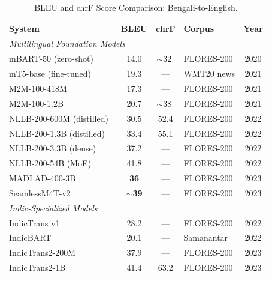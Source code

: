 \documentclass[conference]{IEEEtran}
\begin{document}
\begin{table}[t]
  \centering
  \caption{BLEU and chrF Score Comparison: Bengali-to-English.}
  \label{tab:bleu}
  \small
  \setlength{\tabcolsep}{3pt}
  \begin{tabular}{p{3.4cm} c c p{1.7cm} c}
    \toprule
    \textbf{System} & \textbf{BLEU} & \textbf{chrF} & \textbf{Corpus} & \textbf{Year} \\
    \midrule
    \multicolumn{5}{l}{\textit{Multilingual Foundation Models}} \\
    mBART-50 (zero-shot)~\cite{liu2020mbart50}   & 14.0  & $\sim$32$^\dagger$ & FLORES-200  & 2020 \\
    mT5-base (fine-tuned)~\cite{xue2021mt5}      & 19.3  & ---                & WMT20 news  & 2021 \\
    M2M-100-418M~\cite{fan2021m2m100}            & 17.3  & ---                & FLORES-200  & 2021 \\
    M2M-100-1.2B~\cite{fan2021m2m100}            & 20.7  & $\sim$38$^\dagger$ & FLORES-200  & 2021 \\
    NLLB-200-600M (distilled)~\cite{nllb2022}    & 30.5  & 52.4               & FLORES-200  & 2022 \\
    NLLB-200-1.3B (distilled)~\cite{nllb2022}    & 33.4  & 55.1               & FLORES-200  & 2022 \\
    NLLB-200-3.3B (dense)~\cite{nllb2022}        & 37.2  & ---                & FLORES-200  & 2022 \\
    NLLB-200-54B (MoE)~\cite{nllb2022}           & 41.8  & ---                & FLORES-200  & 2022 \\
    MADLAD-400-3B~\cite{kudugunta2023madlad}      & \textbf{36} & ---         & FLORES-200  & 2023 \\
    SeamlessM4T-v2~\cite{seamlessm4t2023}         & $\sim$\textbf{39} & ---   & FLORES-200  & 2023 \\
    \midrule
    \multicolumn{5}{l}{\textit{Indic-Specialized Models}} \\
    IndicTrans v1~\cite{ramesh2022samanantar}     & 28.2  & ---                & FLORES-200  & 2022 \\
    IndicBART~\cite{dabre2022indicbart}           & 20.1  & ---                & Samanantar  & 2022 \\
    IndicTrans2-200M~\cite{gala2023indictrans2}   & 37.9  & ---                & FLORES-200  & 2023 \\
    IndicTrans2-1B~\cite{gala2023indictrans2}     & 41.4  & 63.2               & FLORES-200  & 2023 \\

\end{tabular}
\end{table}
\end{document}
